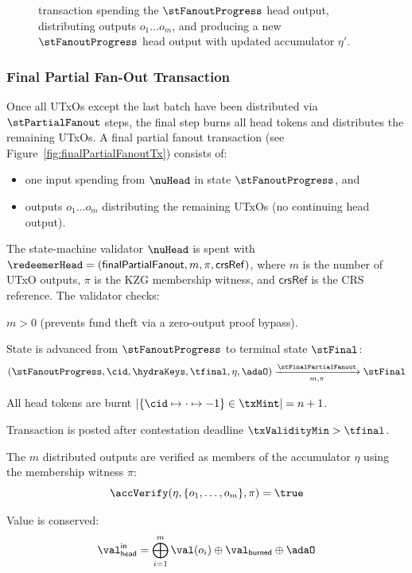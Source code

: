 \begin{figure}[H]
  \centering
  
  \caption{\mtxPartialFanout{} transaction spending the $\stFanoutProgress$ head output,
    distributing outputs $o_{1} \dots o_{m}$, and producing a new $\stFanoutProgress$ head output with updated accumulator $\eta'$.}\label{fig:partialFanoutTx}
\end{figure}

\subsubsection{Final Partial Fan-Out Transaction}\label{sec:final-partial-fanout-tx}

Once all UTxOs except the last batch have been distributed via $\stPartialFanout$ steps,
the final step burns all head tokens and distributes the remaining UTxOs.
A final partial fanout transaction (see Figure~\ref{fig:finalPartialFanoutTx}) consists of:
\begin{itemize}
  \item one input spending from $\nuHead$ in state $\stFanoutProgress$, and
  \item outputs $o_{1} \dots o_{m}$ distributing the remaining UTxOs (no continuing head output).
\end{itemize}

\noindent The state-machine validator $\nuHead$ is spent with
$\redeemerHead = (\mathsf{finalPartialFanout}, m, \pi, \mathsf{crsRef})$, where $m$ is the number of UTxO outputs, $\pi$ is the KZG membership witness, and $\mathsf{crsRef}$ is the CRS reference.
The validator checks:
\begin{menumerate}
  \item $m > 0$ (prevents fund theft via a zero-output proof bypass).
  \item State is advanced from $\stFanoutProgress$ to terminal state $\stFinal$:
  \[
	(\stFanoutProgress,\cid,\hydraKeys,\tfinal,\eta,\adaO) \xrightarrow[m,\pi]{\stFinalPartialFanout} \stFinal
  \]
  \item All head tokens are burnt
  $|\{\cid \mapsto \cdot \mapsto -1\} \in \txMint| = n + 1$.
  \item Transaction is posted after contestation deadline $\txValidityMin > \tfinal$.
  \item The $m$ distributed outputs are verified as members of the accumulator $\eta$ using the membership witness $\pi$:
  \[
	\accVerify(\eta, \{o_1, \ldots, o_m\}, \pi) = \true
  \]
  \item Value is conserved:
  \[
    \val_{\mathsf{head}}^{\mathsf{in}} = \bigoplus_{i=1}^{m} \val(o_i) \oplus \val_{\mathsf{burned}} \oplus \adaO
  \]
\end{menumerate}

